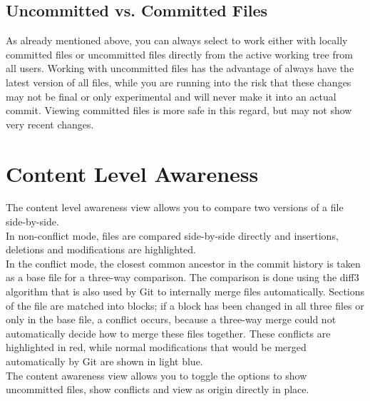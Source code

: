 \subsection{Uncommitted vs. Committed Files}

As already mentioned above, you can always select to work either with locally committed files or uncommitted files directly from the active working tree from all users. Working with uncommitted files has the advantage of always have the latest version of all files, while you are running into the risk that these changes may not be final or only experimental and will never make it into an actual commit. Viewing committed files is more safe in this regard, but may not show very recent changes.







\section{Content Level Awareness}




The content level awareness view allows you to compare two versions of a file side-by-side. \\

In non-conflict mode, files are compared side-by-side directly and insertions, deletions and modifications are highlighted. \\

In the conflict mode, the closest common ancestor in the commit history is taken as a base file for a three-way comparison. The comparison is done using the diff3 algorithm that is also used by Git to internally merge files automatically. Sections of the file are matched into blocks; if a block has been changed in all three files or only in the base file, a conflict occurs, because a three-way merge could not automatically decide how to merge these files together. These conflicts are highlighted in red, while normal modifications that would be merged automatically by Git are shown in light blue. \\

The content awareness view allows you to toggle the options to show uncommitted files, show conflicts and view as origin directly in place.







